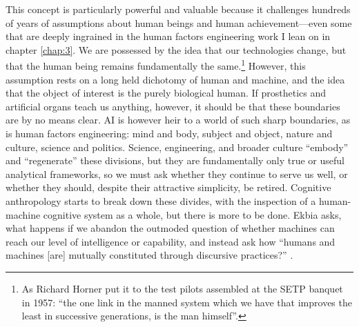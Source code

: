 This concept is particularly powerful and valuable because it
challenges hundreds of years of assumptions about human beings and
human achievement---even some that are deeply ingrained in the human
factors engineering work I lean on in chapter \ref{chap:3}. We are
possessed by the idea that our technologies change, but that the human
being remains fundamentally the same.\footnote{As Richard Horner put
  it to the test pilots assembled at the SETP banquet in 1957: ``the
  one link in the manned system which we have that improves the least
  in successive generations, is the man himself''\cite[p.
    19]{???-mindell}.} However, this assumption rests on a long held 
dichotomy of human and machine, and the idea that the object of
interest is the purely biological human. If prosthetics and artificial
organs teach us anything, however, it should be that these boundaries
are by no means clear. AI is however heir to a world of such sharp
boundaries, as is human factors engineering: mind and body, subject
and object, nature and culture, science and politics\cite[p.
  327]{ekbia}. Science, engineering, and broader culture ``embody'' and
``regenerate'' these divisions\cite[p. 327]{ekbia}, but they are
fundamentally only true or useful analytical frameworks, so we must
ask whether they continue to serve us well, or whether they should,
despite their attractive simplicity, be retired. Cognitive
anthropology starts to break down these 
divides, with the inspection of a human-machine cognitive system as a
whole, but there is more to be done. Ekbia asks, what happens if we
abandon the outmoded question of whether machines can reach our level
of intelligence or capability, and instead ask how  ``humans and machines
[are] mutually constituted through discursive practices?'' \cite[p.
  328]{ekbia}. 

